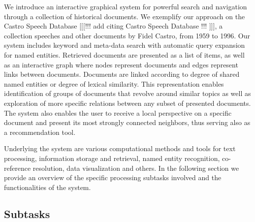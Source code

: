 We introduce an interactive graphical system for powerful search and navigation through a collection of historical documents. 
We exemplify our approach on the Castro Speech Database [[[!!! add citing Castro Speech Database !!! ]]], a collection 
speeches and other documents by Fidel Castro, from 1959 to 1996. Our system includes keyword and meta-data search with automatic query 
expansion for named entities. Retrieved documents are presented as a list of items, as well as an interactive graph where nodes represent 
documents and edges represent links between documents. Documents are linked according to degree of shared named entities or degree of lexical 
similarity. This representation enables identification of groups of documents that revolve around similar topics as well as exploration of 
more specific relations between any subset of presented documents. The system also enables the user to receive a local perspective on a 
specific document and present its most strongly connected neighbors, thus serving also as a recommendation tool. 


Underlying the system are various computational methods and tools for text processing, 
information storage and retrieval, named entity recognition, co-reference resolution, 
data visualization and others. In the following section we provide an overview of the specific processing subtasks 
involved and the functionalities of the system.

\subsection{Subtasks}
\label{sec:subtasks}
